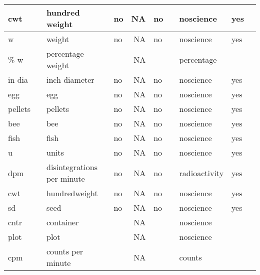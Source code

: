\begin{tabular}{l|l|l|l|r|l|l|l|l|l}
\hline
cwt &  & hundred weight & no & NA & no &  & noscience & yes & \\
\hline
w &  & weight & no & NA & no &  & noscience & yes & \\
\hline
\% w &  & percentage weight &  & NA &  &  & percentage &  & \\
\hline
in dia &  & inch diameter & no & NA & no &  & noscience & yes & \\
\hline
egg &  & egg & no & NA & no &  & noscience & yes & \\
\hline
pellets &  & pellets & no & NA & no &  & noscience & yes & \\
\hline
bee &  & bee & no & NA & no &  & noscience & yes & \\
\hline
fish &  & fish & no & NA & no &  & noscience & yes & \\
\hline
u &  & units & no & NA & no &  & noscience & yes & \\
\hline
dpm &  & disintegrations per minute & no & NA & no &  & radioactivity & yes & \\
\hline
cwt &  & hundredweight & no & NA & no &  & noscience & yes & \\
\hline
sd &  & seed & no & NA & no &  & noscience & yes & \\
\hline
cntr &  & container &  & NA &  &  & noscience &  & \\
\hline
plot &  & plot &  & NA &  &  & noscience &  & \\
\hline
cpm &  & counts per minute &  & NA &  &  & counts &  & \\
\hline
\end{tabular}

